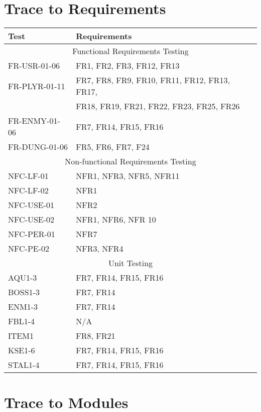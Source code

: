 \documentclass[12pt, titlepage]{article}
\begin{document}
		
\section{Trace to Requirements}

\begin{tabular}{ll}
	\toprule
	Test & Requirements \\
	\midrule
	\multicolumn{2}{c}{Functional Requirements Testing} \\
	\midrule
	FR-USR-01-06 & FR1, FR2, FR3, FR12, FR13 \\
	FR-PLYR-01-11 & FR7, FR8, FR9, FR10, FR11, FR12, FR13, FR17, \\ 
	& FR18, FR19, FR21, FR22, FR23, FR25, FR26\\
	FR-ENMY-01-06 & FR7, FR14, FR15, FR16\\
	FR-DUNG-01-06 & FR5, FR6, FR7, F24\\
	\midrule
	\multicolumn{2}{c}{Non-functional Requirements Testing} \\
	\midrule
	NFC-LF-01 & NFR1, NFR3, NFR5, NFR11 \\
	NFC-LF-02 &  NFR1 \\
	NFC-USE-01 &  NFR2 \\
	NFC-USE-02 &  NFR1, NFR6, NFR 10 \\
	NFC-PER-01 & NFR7 \\
	NFC-PE-02 & NFR3, NFR4  \\
	\midrule
	\multicolumn{2}{c}{Unit Testing} \\
	\midrule
	AQU1-3 & FR7, FR14, FR15, FR16\\
	BOSS1-3 & FR7, FR14\\ 
	ENM1-3 & FR7, FR14\\
	FBL1-4 & N/A\\
	ITEM1 & FR8, FR21\\
	KSE1-6 & FR7, FR14, FR15, FR16\\
	STAL1-4 & FR7, FR14, FR15, FR16\\
	\bottomrule
\end{tabular}
		
\section{Trace to Modules}	
\end{document}

